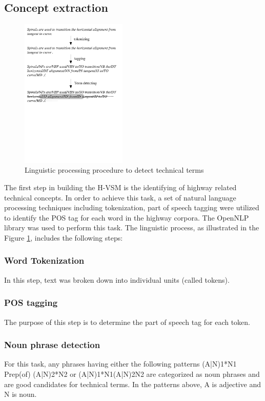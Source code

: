 \documentclass[Journal, InsideFigs, DoubleSpace]{ascelike} %
\begin{document}
\subsection{Concept extraction}

\begin{figure}[t]
\centering
\includegraphics[width=0.45\textwidth]{NP_detecting}
\caption{Linguistic processing procedure to detect technical terms}
\label{fig:np_detect}
\end{figure}

The first step in building the H-VSM is the identifying of highway related technical concepts. In order to achieve this task, a set of natural language processing techniques including tokenization, part of speech tagging were utilized to identify the POS tag for each word in the highway corpora. The OpenNLP library was used to perform this task. The linguistic process, as illustrated in the Figure \ref{fig:np_detect}, includes the following steps:

\subsubsection{Word Tokenization} 
In this step, text was broken down into individual units (called tokens). 
\subsubsection{POS tagging} 
The purpose of this step is to determine the part of speech tag for each token. 
\subsubsection{Noun phrase detection}
For this task, any phrases having either the following patterns (A|N)1*N1 Prep(of) (A|N)2*N2 or (A|N)1*N1(A|N)2N2 are categorized as noun phrases and are good candidates for technical terms. In the patterns above, A is adjective and N is noun. 
\end{document}
